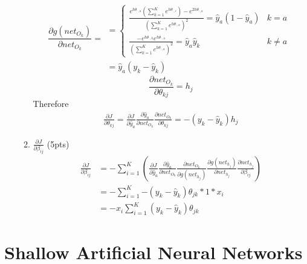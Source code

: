 \documentclass[12pt]{article}
\begin{document}
\begin{enumerate}
\begin{enumerate}
\[\frac{\partial g\left(net_{O_k}\right)}{\partial net_{O_k}} =\begin{array}{l}
 = \left\{ {\begin{array}{*{20}{c}}
{\frac{{{e^{h{\theta _{:,a}}}}\left( {\sum\nolimits_{k = 1}^K {{e^{h{\theta _{:,i}}}}} } \right) - {e^{2h{\theta _{:,a}}}}}}{{{{\left( {\sum\nolimits_{k = 1}^K {{e^{h{\theta _{:,a}}}}} } \right)}^2}}} = {{\hat y}_a}\left( {1 - {{\hat y}_a}} \right)}&{k = a}\\
{\frac{{ - {e^{h{\theta _{:,k}}}}{e^{h{\theta _{:,a}}}}}}{{{{\left( {\sum\nolimits_{k = 1}^K {{e^{h{\theta _{:,a}}}}} } \right)}^2}}} = {{\hat y}_a}{{\hat y}_k}}&{k \ne a}
\end{array}} \right.\\
 = {{\hat y}_a}\left( {{y_k} - {{\hat y}_k}} \right)
\end{array}\]
\[\frac{\partial net_{O_k}}{\partial \theta_{kj}} = h_j\]
Therefore
\begin{align*}
\frac{\partial J}{\partial \theta_{kj}} 
=  \frac{\partial J}{\partial {{\hat y}_a}}\frac{\partial {{\hat y}_a}} {\partial net_{O_k}}\frac{\partial net_{O_k}}{\partial \theta_{kj}} 
= -(y_k-{{\hat y}_k})h_j
\end{align*}
\item $\frac{\partial J}{\partial \beta_{ij}}$ (5pts)\\
\begin{align*}
\frac{\partial J}{\partial \beta_{ij}} &=  - \sum\nolimits_{i = 1}^K{ \left(\frac{\partial J}{\partial {{\hat y}_a}}\frac{\partial {{\hat y}_a}} {\partial net_{O_k}}\frac{\partial net_{O_k}}{\partial g\left( {net_{{h_j}}} \right)} \frac{\partial g\left( {net_{{h_j}}} \right)}{\partial {net_{{h_j}}}}\frac{\partial {net_{{h_j}}}}{\partial \beta_{ij}}\right)}
 \\&= - \sum\nolimits_{i = 1}^K{ -(y_k-{{\hat y}_k})\theta_{jk}*1*x_i} 
 \\& = -x_i \sum\nolimits_{i = 1}^K{(y_k-{{\hat y}_k})\theta_{jk}}
\end{align*}
\end{enumerate}
\end{enumerate}

\newpage
\section{Shallow Artificial Neural Networks}
\end{document}
